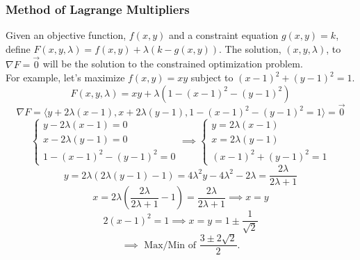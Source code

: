 \subsubsection{Method of Lagrange Multipliers}
\noindent
Given an objective function, $f(x,y)$ and a constraint equation $g(x,y) = k$, define $F(x,y,\lambda) = f(x,y) + \lambda(k-g(x,y))$.
The solution, $(x, y, \lambda)$, to $\nabla F = \vec{0}$ will be the solution to the constrained optimization problem.\\

\noindent
For example, let's maximize $f(x,y)=xy$ subject to $(x-1)^2 + (y-1)^2 = 1$.
\begin{equation*}
	F(x,y,\lambda) = xy + \lambda(1 - (x-1)^2 - (y-1)^2)	
\end{equation*}
\begin{equation*}
	\nabla F = \langle y + 2\lambda(x-1), x+2\lambda(y-1), 1 - (x-1)^2 - (y-1)^2 = 1 \rangle = \vec{0}
\end{equation*}
\begin{equation*}
	\begin{cases}
		y - 2\lambda(x-1) = 0 \\ 
		x - 2\lambda(y-1) = 0 \\ 
		1 - (x-1)^2 - (y-1)^2 = 0
	\end{cases}
	\implies \begin{cases}
		y = 2\lambda(x-1) \\ 
		x = 2\lambda(y-1) \\ 
		(x-1)^2 + (y-1)^2 = 1
	\end{cases}
\end{equation*}
\begin{equation*}
	y = 2\lambda(2\lambda(y-1) - 1) = 4\lambda^2 y - 4\lambda^2 - 2\lambda = \frac{2\lambda}{2\lambda+1}
\end{equation*}
\begin{equation*}
	x = 2\lambda\left(\frac{2\lambda}{2\lambda+1} - 1\right) = \frac{2\lambda}{2\lambda+1} \implies x = y	
\end{equation*}
\begin{equation*}
	2(x-1)^2 = 1 \implies x = y = 1 \pm \frac{1}{\sqrt{2}}	
\end{equation*}
\begin{equation*}
	\implies \text{ Max/Min of } \frac{3 \pm 2\sqrt{2}}{2}.
\end{equation*}